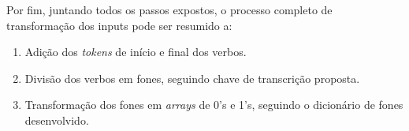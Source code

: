 Por fim, juntando todos os passos expostos, o processo completo de transformação dos inputs pode ser resumido a:

\begin{enumerate}
    \item Adição dos \textit{tokens} de início e final dos verbos.
    \item Divisão dos verbos em fones, seguindo chave de transcrição proposta.
    \item Transformação dos fones em \textit{arrays} de 0's e 1's, seguindo o dicionário de fones desenvolvido.
\end{enumerate}







